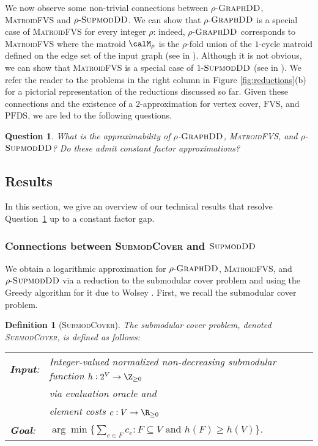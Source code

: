 \documentclass{article}
\newtheorem{definition}{Definition}[section]
\newtheorem{question}{Question}
\newcommand{\mfvs}{\textsc{MatroidFVS}\xspace}
\newcommand{\dds}{\ensuremath{\textsc{GraphDD}}\xspace}
\newcommand{\rhodds}[1]{\ensuremath{#1\text{-}\dds}\xspace}
\newcommand{\pfds}{\ensuremath{\text{PFDS}}\xspace}
\newcommand{\fvs}{\ensuremath{\text{FVS}}\xspace}
\newcommand{\sdds}{\ensuremath{\textsc{SupmodDD}}\xspace}
\newcommand{\rhosdds}[1]{\ensuremath{#1\text{-}\sdds}}
\newcommand{\submodcover}{\textsc{SubmodCover}\xspace}
\begin{document}
We now observe some non-trivial connections between $\rho$-\dds, \mfvs and \rhosdds{\rho}. We can show that $\rho$-\dds is a special case of \mfvs for every integer $\rho$: indeed, $\rho$-\dds corresponds to \mfvs where the matroid $\calM_\rho$ is the $\rho$-fold union of the $1$-cycle matroid defined on the edge set of the input graph (see  in ). Although it is not obvious, we can show that \mfvs is a special case of \rhosdds{1} (see  in ). 
We refer the reader to the problems in the right column in Figure \ref{fig:reductions}(b) for a pictorial representation of the reductions discussed so far. 
Given these connections and the existence of a $2$-approximation for vertex cover, \fvs, and \pfds, we are led to the following questions. 

\begin{question}\label{question:main}
  What is the approximability of $\rho$-\dds, \mfvs, and $\rho$-\sdds? Do these admit constant factor approximations?
\end{question}

\subsection{Results} 
In this section, we give an overview of our technical results that resolve Question~\ref{question:main} up to a constant factor gap.
\subsubsection{Connections between \submodcover and \sdds}
We obtain a logarithmic approximation for \rhodds{\rho}, \mfvs, and \rhosdds{\rho} via a reduction to the
submodular cover problem and using the Greedy algorithm for it due to Wolsey \cite{Wolsey82}. 
First, we recall the submodular cover problem. 
\begin{definition}[\submodcover] The submodular cover problem, denoted \submodcover, is defined as follows:
    \begin{mdframed}
\begin{tabular}{ l l }
 \emph{\textbf{Input}:} &  Integer-valued normalized non-decreasing submodular function $h:2^V\rightarrow\Z_{\ge 0}$ \\
 & via evaluation oracle and \\ 
    & element costs $c:V\rightarrow\R_{\ge 0}$ \vspace{1mm}\\  
 \emph{\textbf{Goal}:} & $\arg \min\{\sum_{e\in F}c_e : F \subseteq V \text{ and } h(F) \ge h(V)\}$. 
\end{tabular}
\end{mdframed}
\end{definition}
\end{document}
